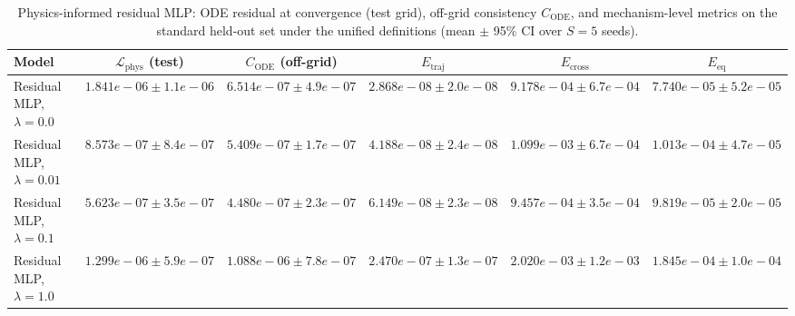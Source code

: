 \begin{table}[t]
\centering
\scriptsize
\caption{Physics-informed residual MLP: ODE residual at convergence (test grid), off-grid consistency $C_{\mathrm{ODE}}$, and mechanism-level metrics on the standard held-out set under the unified definitions (mean $\pm$ 95\% CI over $S=5$ seeds).}
\label{tab:pi_gradient}
\begin{tabular}{lccccc}
\hline
Model & $\mathcal L_{\mathrm{phys}}$ (test) & $C_{\mathrm{ODE}}$ (off-grid) & $E_{\mathrm{traj}}$ & $E_{\mathrm{cross}}$ & $E_{\mathrm{eq}}$ \\
\hline
Residual MLP, $\lambda=0.0$ & $1.841e-06 \pm 1.1e-06$ & $6.514e-07 \pm 4.9e-07$ & $2.868e-08 \pm 2.0e-08$ & $9.178e-04 \pm 6.7e-04$ & $7.740e-05 \pm 5.2e-05$ \\
Residual MLP, $\lambda=0.01$ & $8.573e-07 \pm 8.4e-07$ & $5.409e-07 \pm 1.7e-07$ & $4.188e-08 \pm 2.4e-08$ & $1.099e-03 \pm 6.7e-04$ & $1.013e-04 \pm 4.7e-05$ \\
Residual MLP, $\lambda=0.1$ & $5.623e-07 \pm 3.5e-07$ & $4.480e-07 \pm 2.3e-07$ & $6.149e-08 \pm 2.3e-08$ & $9.457e-04 \pm 3.5e-04$ & $9.819e-05 \pm 2.0e-05$ \\
Residual MLP, $\lambda=1.0$ & $1.299e-06 \pm 5.9e-07$ & $1.088e-06 \pm 7.8e-07$ & $2.470e-07 \pm 1.3e-07$ & $2.020e-03 \pm 1.2e-03$ & $1.845e-04 \pm 1.0e-04$ \\
\hline
\end{tabular}
\end{table}